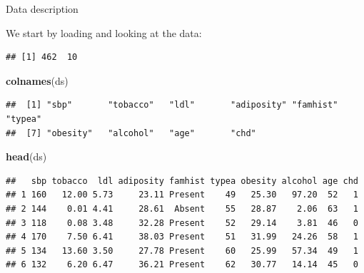 \documentclass[
  ignorenonframetext,
]{beamer}
\newenvironment{Shaded}{\begin{snugshade}}{\end{snugshade}}
\newcommand{\DataTypeTok}[1]{\textcolor[rgb]{0.13,0.29,0.53}{#1}}
\newcommand{\DecValTok}[1]{\textcolor[rgb]{0.00,0.00,0.81}{#1}}
\newcommand{\KeywordTok}[1]{\textcolor[rgb]{0.13,0.29,0.53}{\textbf{#1}}}
\newcommand{\NormalTok}[1]{#1}
\newcommand{\OperatorTok}[1]{\textcolor[rgb]{0.81,0.36,0.00}{\textbf{#1}}}
\newcommand{\StringTok}[1]{\textcolor[rgb]{0.31,0.60,0.02}{#1}}
\begin{document}
\begin{frame}[fragile]

\begin{block}{Data description}

We start by loading and looking at the data:

\begin{Shaded}
\end{Shaded}

\begin{verbatim}
## [1] 462  10
\end{verbatim}

\begin{Shaded}
\begin{Highlighting}[]
\KeywordTok{colnames}\NormalTok{(ds)}
\end{Highlighting}
\end{Shaded}

\begin{verbatim}
##  [1] "sbp"       "tobacco"   "ldl"       "adiposity" "famhist"   "typea"    
##  [7] "obesity"   "alcohol"   "age"       "chd"
\end{verbatim}

\begin{Shaded}
\begin{Highlighting}[]
\KeywordTok{head}\NormalTok{(ds)}
\end{Highlighting}
\end{Shaded}

\begin{verbatim}
##   sbp tobacco  ldl adiposity famhist typea obesity alcohol age chd
## 1 160   12.00 5.73     23.11 Present    49   25.30   97.20  52   1
## 2 144    0.01 4.41     28.61  Absent    55   28.87    2.06  63   1
## 3 118    0.08 3.48     32.28 Present    52   29.14    3.81  46   0
## 4 170    7.50 6.41     38.03 Present    51   31.99   24.26  58   1
## 5 134   13.60 3.50     27.78 Present    60   25.99   57.34  49   1
## 6 132    6.20 6.47     36.21 Present    62   30.77   14.14  45   0
\end{verbatim}


\end{block}
\end{frame}
\end{document}
